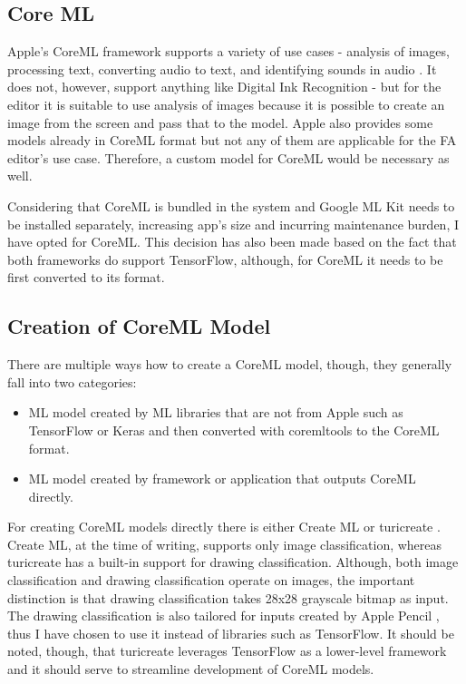 \subsection{Core ML}

Apple's CoreML framework supports a variety of use cases - analysis of images, processing text, converting audio to text, and identifying sounds in audio \cite{coreml}. It does not, however, support anything like Digital Ink Recognition - but for the editor it is suitable to use analysis of images because it is possible to create an image from the screen and pass that to the model. Apple also provides some models already in CoreML format \cite{coreml-models} but not any of them are applicable for the FA editor's use case. Therefore, a custom model for CoreML would be necessary as well.

Considering that CoreML is bundled in the system and Google ML Kit needs to be installed separately, increasing app's size and incurring maintenance burden, I have opted for CoreML. This decision has also been made based on the fact that both frameworks do support TensorFlow, although, for CoreML it needs to be first converted to its format.

\subsection{Creation of CoreML Model}

There are multiple ways how to create a CoreML model, though, they generally fall into two categories:
\begin{itemize}
    \item ML model created by ML libraries that are not from Apple such as TensorFlow or Keras \cite{keras} and then converted with coremltools \cite{coremltools} to the CoreML format.
    \item ML model created by framework or application that outputs CoreML directly.
\end{itemize}

For creating CoreML models directly there is either Create ML \cite{create-ml} or turicreate \cite{turicreate}. Create ML, at the time of writing, supports only image classification, whereas turicreate has a built-in support for drawing classification. Although, both image classification and drawing classification operate on images, the important distinction is that drawing classification takes 28x28 grayscale bitmap as input. The drawing classification is also tailored for inputs created by Apple Pencil \cite{drawing-classification}, thus I have chosen to use it instead of libraries such as TensorFlow. It should be noted, though, that turicreate leverages TensorFlow as a lower-level framework and it should serve to streamline development of CoreML models.

